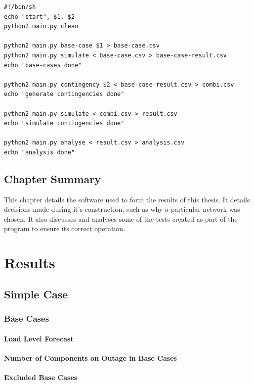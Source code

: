 \documentclass[a4paper,oneside,12pt]{report}
\begin{document}
\begin{verbatim}
#!/bin/sh
echo "start", $1, $2
python2 main.py clean

python2 main.py base-case $1 > base-case.csv
python2 main.py simulate < base-case.csv > base-case-result.csv
echo "base-cases done"

python2 main.py contingency $2 < base-case-result.csv > combi.csv
echo "generate contingencies done"

python2 main.py simulate < combi.csv > result.csv
echo "simulate contingencies done"

python2 main.py analyse < result.csv > analysis.csv
echo "analysis done"
\end{verbatim}


\section{Chapter Summary}

This chapter details the software used to form the results of this thesis. It details decisions made during it's construction, such as why a particular network was chosen. It also discusses and analyses some of the tests created as part of the program to ensure its correct operation.

\chapter{Results}

\section{Simple Case}

\subsection{Base Cases}
\subsubsection{Load Level Forecast}
\subsubsection{Number of Components on Outage in Base Cases}
\subsubsection{Excluded Base Cases}
\end{document}

